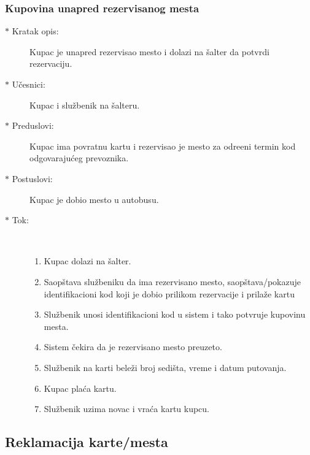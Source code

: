 \subsubsection{Kupovina unapred rezervisanog mesta}
\begin{description}
	\item[$\ast$ Kratak opis: ] Kupac je unapred rezervisao mesto i dolazi na \v salter da potvrdi rezervaciju.
	\item[$\ast$ U\v cesnici: ] Kupac i slu\v zbenik na \v salteru.
	\item[$\ast$ Preduslovi: ] Kupac ima povratnu kartu i rezervisao je mesto za odre\dj{}eni termin kod odgovaraju\'ceg prevoznika.
	\item[$\ast$ Postuslovi: ] Kupac je dobio mesto u autobusu.
	\item[$\ast$ Tok: ] \ \\
	\begin{enumerate}
		\item Kupac dolazi na \v salter.
		\item Saop\v stava slu\v zbeniku da ima rezervisano mesto, saop\v stava/pokazuje identifikacioni kod koji je dobio prilikom rezervacije i prila\v ze kartu
		\item Slu\v zbenik unosi identifikacioni kod u sistem i tako potvr\dj{}uje kupovinu mesta.
		\item Sistem \v cekira da je rezervisano mesto preuzeto.
		\item Slu\v zbenik na karti bele\v zi broj sedi\v sta, vreme i datum putovanja.
		\item Kupac pla\'ca kartu.
		\item Slu\v zbenik uzima novac i vra\'ca kartu kupcu.
	\end{enumerate}
\end{description}

\subsection{Reklamacija karte/mesta}

